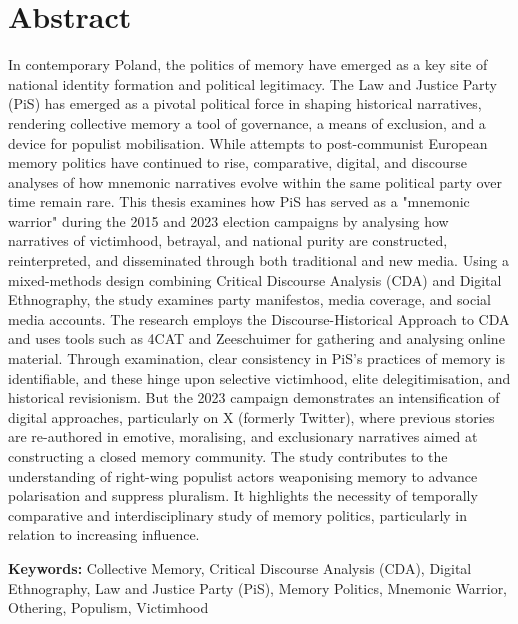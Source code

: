 \section*{Abstract}

In contemporary Poland, the politics of memory have emerged as a key site of national identity formation and political legitimacy. The Law and Justice Party (PiS) has emerged as a pivotal political force in shaping historical narratives, rendering collective memory a tool of governance, a means of exclusion, and a device for populist mobilisation. While attempts to post-communist European memory politics have continued to rise, comparative, digital, and discourse analyses of how mnemonic narratives evolve within the same political party over time remain rare. This thesis examines how PiS has served as a "mnemonic warrior" during the 2015 and 2023 election campaigns by analysing how narratives of victimhood, betrayal, and national purity are constructed, reinterpreted, and disseminated through both traditional and new media. Using a mixed-methods design combining Critical Discourse Analysis (CDA) and Digital Ethnography, the study examines party manifestos, media coverage, and social media accounts. The research employs the Discourse-Historical Approach to CDA and uses tools such as 4CAT and Zeeschuimer for gathering and analysing online material. Through examination, clear consistency in PiS's practices of memory is identifiable, and these hinge upon selective victimhood, elite delegitimisation, and historical revisionism. But the 2023 campaign demonstrates an intensification of digital approaches, particularly on X (formerly Twitter), where previous stories are re-authored in emotive, moralising, and exclusionary narratives aimed at constructing a closed memory community. The study contributes to the understanding of right-wing populist actors weaponising memory to advance polarisation and suppress pluralism. It highlights the necessity of temporally comparative and interdisciplinary study of memory politics, particularly in relation to increasing influence.

\vfill

\noindent\textbf{Keywords:} Collective Memory, Critical Discourse Analysis (CDA), Digital Ethnography, Law and Justice Party (PiS), Memory Politics, Mnemonic Warrior, Othering, Populism, Victimhood

\newpage\null\thispagestyle{empty}\newpage

